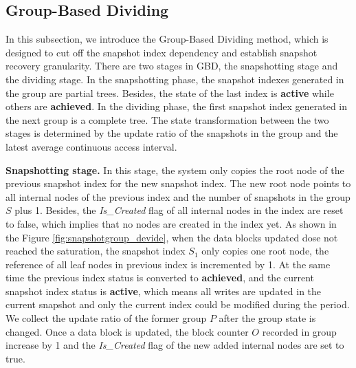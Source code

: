 \documentclass[sigconf, nonacm]{acmart}
\begin{document}
\subsection{Group-Based Dividing}
\label{GBD}
In this subsection, we introduce the Group-Based Dividing method, which is designed to cut off the snapshot index dependency and establish snapshot recovery granularity.
There are two stages in GBD, the snapshotting stage and the dividing stage. 
In the snapshotting phase, the snapshot indexes generated in the group are partial trees. Besides, the state of the last index is \textbf{active} while others are \textbf{achieved}.  In the dividing phase, the first snapshot index generated in the next group is a complete tree. The state transformation between the two stages is determined by the update ratio of the snapshots in the group and the latest average continuous access interval. 

\textbf{Snapshotting stage.} In this stage, the system only copies the root node of the previous snapshot index for the new snapshot index. The new root node points to all internal nodes of the previous index and the number of snapshots in the group $S$ plus 1.
Besides, the \emph{Is\_Created} flag of all internal nodes in the index are reset to false, which implies that no nodes are created in the index yet.
As shown in the Figure \ref{fig:snapshotgroup_devide}, when the data blocks updated dose not reached the saturation, the snapshot index $S_1$ only copies one root node, the reference of all leaf nodes in previous index is incremented by 1. 
At the same time the previous index status is converted to \textbf{achieved}, and the current snapshot index status is \textbf{active}, which means all writes are updated in the current snapshot and only the current index could be modified during the period. 
We collect the update ratio of the former group $P$ after the group state is changed.
Once a data block is updated, the block counter $O$ recorded in group increase by 1 and the \emph{Is\_Created} flag of the new added internal nodes are set to true.
\end{document}
